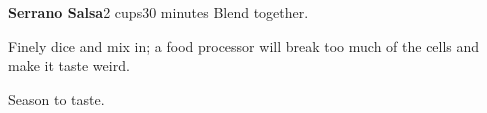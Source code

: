 \documentclass[../Cookbook.tex]{subfiles}
\begin{document}
\begin{recipe}{\textbf{Serrano Salsa}}{2 cups}{30 minutes}
	Blend together.

	Finely dice and mix in; a food processor will break too much of the cells and make it taste weird.

	Season to taste.

\end{recipe}
\end{document}
